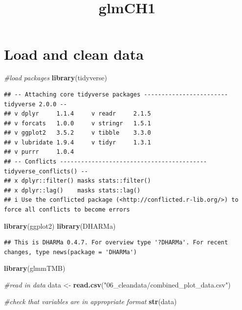 \documentclass[
]{article}
\title{glmCH1}
\author{}
\date{\vspace{-2.5em}}
\newenvironment{Shaded}{\begin{snugshade}}{\end{snugshade}}
\newcommand{\CommentTok}[1]{\textcolor[rgb]{0.56,0.35,0.01}{\textit{#1}}}
\newcommand{\FunctionTok}[1]{\textcolor[rgb]{0.13,0.29,0.53}{\textbf{#1}}}
\newcommand{\NormalTok}[1]{#1}
\newcommand{\OtherTok}[1]{\textcolor[rgb]{0.56,0.35,0.01}{#1}}
\newcommand{\StringTok}[1]{\textcolor[rgb]{0.31,0.60,0.02}{#1}}
\begin{document}
\maketitle

\section{Load and clean data}\label{load-and-clean-data}

\begin{Shaded}
\begin{Highlighting}[]
\CommentTok{\#load packages}
\FunctionTok{library}\NormalTok{(tidyverse)}
\end{Highlighting}
\end{Shaded}

\begin{verbatim}
## -- Attaching core tidyverse packages ------------------------ tidyverse 2.0.0 --
## v dplyr     1.1.4     v readr     2.1.5
## v forcats   1.0.0     v stringr   1.5.1
## v ggplot2   3.5.2     v tibble    3.3.0
## v lubridate 1.9.4     v tidyr     1.3.1
## v purrr     1.0.4     
## -- Conflicts ------------------------------------------ tidyverse_conflicts() --
## x dplyr::filter() masks stats::filter()
## x dplyr::lag()    masks stats::lag()
## i Use the conflicted package (<http://conflicted.r-lib.org/>) to force all conflicts to become errors
\end{verbatim}

\begin{Shaded}
\begin{Highlighting}[]
\FunctionTok{library}\NormalTok{(ggplot2)}
\FunctionTok{library}\NormalTok{(DHARMa)}
\end{Highlighting}
\end{Shaded}

\begin{verbatim}
## This is DHARMa 0.4.7. For overview type '?DHARMa'. For recent changes, type news(package = 'DHARMa')
\end{verbatim}

\begin{Shaded}
\begin{Highlighting}[]
\FunctionTok{library}\NormalTok{(glmmTMB)}

\CommentTok{\#read in data}
\NormalTok{data }\OtherTok{\textless{}{-}} \FunctionTok{read.csv}\NormalTok{(}\StringTok{"06\_cleandata/combined\_plot\_data.csv"}\NormalTok{)}

\CommentTok{\#check that variables are in appropriate format}
\FunctionTok{str}\NormalTok{(data)}
\end{Highlighting}
\end{Shaded}
\end{document}
